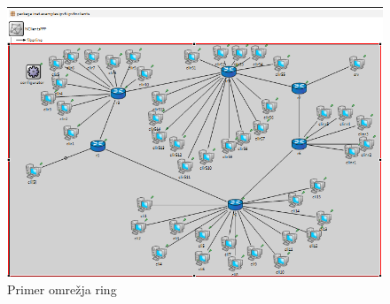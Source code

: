\documentclass[11pt,a4paper,slovene]{myarticle}
\begin{document}
\begin{figure}[H]
\includegraphics[scale=0.5]{slike/obrocnoOmrezije.png}
\caption{Primer omrežja ring}
\end{figure}



\pagebreak


\end{document}

